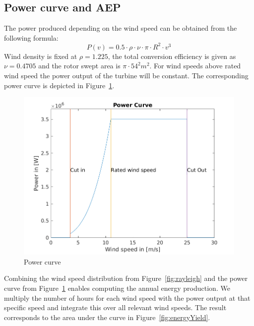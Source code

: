 \documentclass[10pt]{article}
\begin{document}
\subsection{Power curve and AEP}
The power produced depending on the wind speed can be obtained from the following formula:
\begin{equation*}
P(v) = 0.5 \cdot \rho \cdot \nu \cdot \pi \cdot R^2 \cdot v^3
\end{equation*}
Wind density is fixed at $\rho= 1.225$, the total conversion efficiency is given as $\nu=0.4705$ and the rotor swept area is $\pi \cdot 54^2 m^2$. For wind speeds above rated wind speed the power output of the turbine will be constant.
The corresponding power curve is depicted in Figure~\ref{fig:powercurve}. 

\begin{figure}[H]
\centering
\includegraphics[width=1\linewidth]{../CIP_5/CIP_Tutorial_5_-_Windfield_and_wake_simulation/power_curve.png}
\caption{Power curve}
\label{fig:powercurve}
\end{figure} 

Combining the wind speed distribution from Figure~\ref{fig:rayleigh} and the power curve from Figure~\ref{fig:powercurve} enables computing the annual energy production. We multiply the number of hours for each wind speed with the power output at that specific speed and integrate this over all relevant wind speeds. The result corresponds to the area under the curve in Figure~\ref{fig:energyYield}. 
\end{document}
